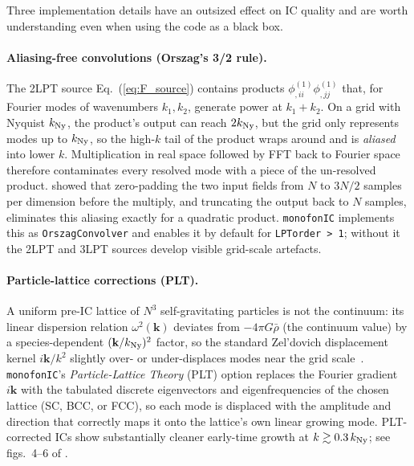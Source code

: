 \documentclass[12pt]{article}
\newcommand{\bk}{\mathbf{k}}
\begin{document}
Three implementation details have an outsized effect on IC quality
and are worth understanding even when using the code as a black box.

\paragraph{Aliasing-free convolutions (Orszag's 3/2 rule).}
The 2LPT source Eq.~(\ref{eq:F_source}) contains products
$\phi^{(1)}_{,ii}\phi^{(1)}_{,jj}$ that, for Fourier modes of
wavenumbers $k_1, k_2$, generate power at $k_1+k_2$.  On a grid with
Nyquist $k_{\rm Ny}$, the product's output can reach $2k_{\rm Ny}$,
but the grid only represents modes up to $k_{\rm Ny}$, so the
high-$k$ tail of the product wraps around and is \emph{aliased} into
lower $k$.  Multiplication in real space followed by FFT back to
Fourier space therefore contaminates every resolved mode with a
piece of the un-resolved product.  \citet{Orszag1971} showed that
zero-padding the two input fields from $N$ to $3N/2$ samples per
dimension before the multiply, and truncating the output back to $N$
samples, eliminates this aliasing exactly for a quadratic product.
\texttt{monofonIC} implements this as \texttt{OrszagConvolver} and
enables it by default for \texttt{LPTorder > 1}; without it the 2LPT
and 3LPT sources develop visible grid-scale artefacts.

\paragraph{Particle-lattice corrections (PLT).}
A uniform pre-IC lattice of $N^3$ self-gravitating particles is not
the continuum: its linear dispersion relation
$\omega^2(\bk)$ deviates from $-4\pi G\bar\rho$ (the continuum value)
by a species-dependent $(\bk/k_{\rm Ny})^2$ factor, so the standard
Zel'dovich displacement kernel $i\bk/k^2$ slightly over- or
under-displaces modes near the grid
scale~\citep{MarcosEtal2006,Garrison2016}.  \texttt{monofonIC}'s
\emph{Particle-Lattice Theory} (PLT) option replaces the Fourier
gradient $i\bk$ with the tabulated discrete eigenvectors and
eigenfrequencies of the chosen lattice (SC, BCC, or FCC), so each
mode is displaced with the amplitude and direction that correctly
maps it onto the lattice's own linear growing mode.  PLT-corrected
ICs show substantially cleaner early-time growth at $k \gtrsim
0.3\,k_{\rm Ny}$; see figs.~4--6 of \citet{Michaux2020}.
\end{document}

